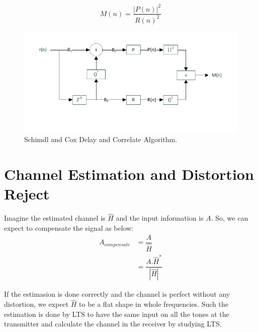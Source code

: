\begin{equation} \label{M_n}
M(n)= \dfrac{|P(n)|^{2}}{R(n)^{2}}
\end{equation}

\begin{figure}[h!]
\centering
\includegraphics[width=\textwidth]{content/fig/schl_cox_mdl.pdf}
\caption{Schimdl and Cox Delay and Correlate Algorithm.}
\label{fig:schimdl_cox}
\end{figure}

\section{Channel Estimation and Distortion Reject}
\label{section:channel_est}

Imagine the estimated channel is $\hat{H}$ and the input information is $A$. So, we can expect to compensate the signal as below:\\

\begin{equation} \label{channel_Comp}
\begin{split}
A_{compensate} & = \dfrac{A}{\hat{H}}\\
&= \dfrac{A.{\hat{H}}^*}{|\hat{H}|}
\end{split}
\end{equation}

If the estimasion is done correctly and the channel is perfect without any distortion, we expect $\hat{H}$ to be a flat shape in whole frequencies. Such the estimation is done by LTS to have the same input on all the tones at the transmitter and calculate the channel in the receiver by studying LTS.\\